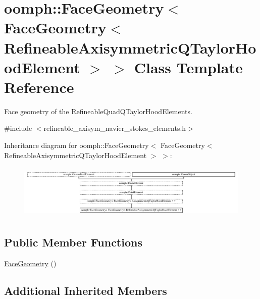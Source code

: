 \hypertarget{classoomph_1_1FaceGeometry_3_01FaceGeometry_3_01RefineableAxisymmetricQTaylorHoodElement_01_4_01_4}{}\section{oomph\+:\+:Face\+Geometry$<$ Face\+Geometry$<$ Refineable\+Axisymmetric\+Q\+Taylor\+Hood\+Element $>$ $>$ Class Template Reference}
\label{classoomph_1_1FaceGeometry_3_01FaceGeometry_3_01RefineableAxisymmetricQTaylorHoodElement_01_4_01_4}


Face geometry of the Refineable\+Quad\+Q\+Taylor\+Hood\+Elements.  




{\ttfamily \#include $<$refineable\+\_\+axisym\+\_\+navier\+\_\+stokes\+\_\+elements.\+h$>$}

Inheritance diagram for oomph\+:\+:Face\+Geometry$<$ Face\+Geometry$<$ Refineable\+Axisymmetric\+Q\+Taylor\+Hood\+Element $>$ $>$\+:\begin{figure}[H]
\begin{center}
\leavevmode
\includegraphics[height=2.636535cm]{classoomph_1_1FaceGeometry_3_01FaceGeometry_3_01RefineableAxisymmetricQTaylorHoodElement_01_4_01_4}
\end{center}
\end{figure}
\subsection*{Public Member Functions}
\begin{DoxyCompactItemize}
\item 
\hyperlink{classoomph_1_1FaceGeometry_3_01FaceGeometry_3_01RefineableAxisymmetricQTaylorHoodElement_01_4_01_4_af56e8f7646fa13d0abae9756943d551d}{Face\+Geometry} ()
\end{DoxyCompactItemize}
\subsection*{Additional Inherited Members}


